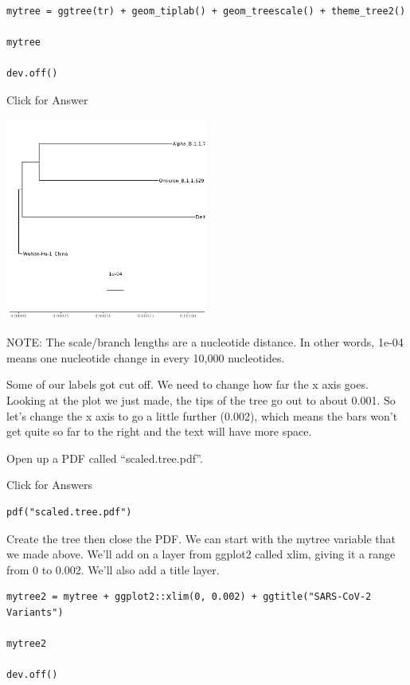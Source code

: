 \documentclass[
]{book}
\begin{document}
\begin{verbatim}
mytree = ggtree(tr) + geom_tiplab() + geom_treescale() + theme_tree2()

mytree

dev.off()
\end{verbatim}

Click for Answer

\includegraphics[width=0.5\textwidth,height=\textheight]{./Figures/labeled.tree.png}

\hfill\break

NOTE: The scale/branch lengths are a nucleotide distance. In other words, 1e-04 means one nucleotide change in every 10,000 nucleotides.

Some of our labels got cut off. We need to change how far the x axis goes. Looking at the plot we just made, the tips of the tree go out to about 0.001. So let's change the x axis to go a little further (0.002), which means the bars won't get quite so far to the right and the text will have more space.

Open up a PDF called ``scaled.tree.pdf''.

Click for Answers

\begin{verbatim}
pdf("scaled.tree.pdf")
\end{verbatim}

\hfill\break

Create the tree then close the PDF. We can start with the mytree variable that we made above. We'll add on a layer from ggplot2 called xlim, giving it a range from 0 to 0.002. We'll also add a title layer.

\begin{verbatim}
mytree2 = mytree + ggplot2::xlim(0, 0.002) + ggtitle("SARS-CoV-2 Variants")

mytree2

dev.off()
\end{verbatim}
\end{document}
